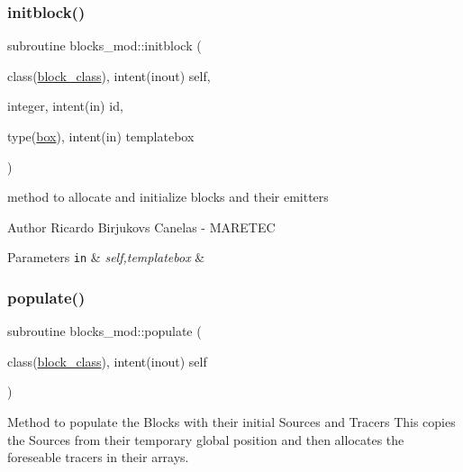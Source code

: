 \subsubsection{\texorpdfstring{initblock()}{initblock()}}
{\footnotesize\ttfamily subroutine blocks\+\_\+mod\+::initblock (\begin{DoxyParamCaption}\item[{class(\hyperlink{structblocks__mod_1_1block__class}{block\+\_\+class}), intent(inout)}]{self,  }\item[{integer, intent(in)}]{id,  }\item[{type(\hyperlink{structgeometry__mod_1_1box}{box}), intent(in)}]{templatebox }\end{DoxyParamCaption})\hspace{0.3cm}{\ttfamily [private]}}



method to allocate and initialize blocks and their emitters 

\begin{DoxyAuthor}{Author}
Ricardo Birjukovs Canelas -\/ M\+A\+R\+E\+T\+EC 
\end{DoxyAuthor}

\begin{DoxyParams}[1]{Parameters}
\mbox{\tt in}  & {\em self,templatebox} & \\
\hline
\end{DoxyParams}
\mbox{\label{namespaceblocks__mod_a7585844eb1b43604c04cb7a24c56205e}} 
\subsubsection{\texorpdfstring{populate()}{populate()}}
{\footnotesize\ttfamily subroutine blocks\+\_\+mod\+::populate (\begin{DoxyParamCaption}\item[{class(\hyperlink{structblocks__mod_1_1block__class}{block\+\_\+class}), intent(inout)}]{self }\end{DoxyParamCaption})\hspace{0.3cm}{\ttfamily [private]}}



Method to populate the Blocks with their initial Sources and Tracers This copies the Sources from their temporary global position and then allocates the foreseable tracers in their arrays. 

